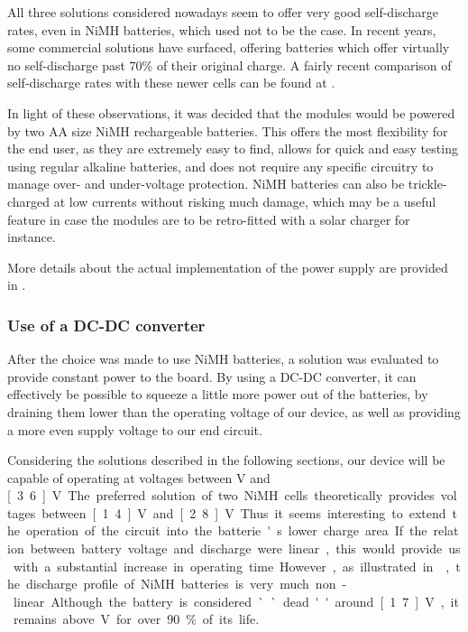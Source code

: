 All three solutions considered nowadays seem to offer very good self-discharge
rates, even in NiMH batteries, which used not to be the case. In recent years,
some commercial solutions have surfaced, offering batteries which offer
virtually no self-discharge past 70\% of their original
charge\cite{testingeneloop}. A fairly recent comparison of self-discharge rates
with these newer cells can be found at \cite{nimhvslipo}.

In light of these observations, it was decided that the modules would be powered
by two AA size NiMH rechargeable batteries. This offers the most flexibility for
the end user, as they are extremely easy to find, allows for quick and easy
testing using regular alkaline batteries, and does not require any specific
circuitry to manage over- and under-voltage protection. NiMH batteries can also
be trickle-charged at low currents without risking much damage, which may be a
useful feature in case the modules are to be retro-fitted with a solar charger
for instance.

More details about the actual implementation of the power supply are provided in
.

\subsubsection{Use of a DC-DC converter}
After the choice was made to use NiMH batteries, a solution was evaluated to
provide constant power to the board. By using a DC-DC converter, it can
effectively be possible to squeeze a little more power out of the batteries, by
draining them lower than the operating voltage of our device, as well as
providing a more even supply voltage to our end circuit.

Considering the solutions described in the following sections, our device will
be capable of operating at voltages between \unit[2]{V} and \unit[3.6]{V}. The
preferred solution of two NiMH cells theoretically provides voltages between
\unit[1.4]{V} and \unit[2.8]{V}. Thus it seems interesting to extend the
operation of the circuit into the batterie's lower charge area. If the relation
between battery voltage and discharge were linear, this would provide us with a
substantial increase in operating time. However, as illustrated in
, the discharge profile of NiMH batteries is very much
non-linear. Although the battery is considered ``dead'' around \unit[1.7]{V}, it
remains above \unit[2]{V} for over 90\% of its life.

